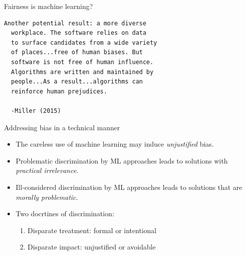 \documentclass[12pt,t,handout]{beamer}
\begin{document}

\begin{frame}[fragile,c]{Fairness is machine learning?}

\begin{center}
\begin{minipage}[c]{11.25cm}
\begin{semiverbatim}
\lstset{basicstyle=\normalsize}
\begin{lstlisting}[linewidth=11.25cm]
  Another potential result: a more diverse
  workplace. The software relies on data
  to surface candidates from a wide variety
  of places...free of human biases. But
  software is not free of human influence.
  Algorithms are written and maintained by
  people...As a result...algorithms can
  reinforce human prejudices.

  -Miller (2015)
\end{lstlisting}
\end{semiverbatim}
\end{minipage}
\end{center}


\end{frame}


\begin{frame}[c]{Addressing bias in a technical manner}

\begin{center}
\begin{itemize}
  \itemsep12pt
  \item The careless use of machine learning may induce \textit{unjustified}
    bias.
  \item Problematic discrimination by ML approaches leads to solutions with
    \textit{practical irrelevance}.
  \item Ill-considered discrimination by ML approaches leads to solutions that
    are \textit{morally problematic}.
  \item Two docrtines of discrimination:
    \begin{enumerate}
      \item Disparate treatment: formal or intentional
      \item Disparate impact: unjustified or avoidable
    \end{enumerate}
\end{itemize}
\end{center}


\end{frame}
\end{document}
